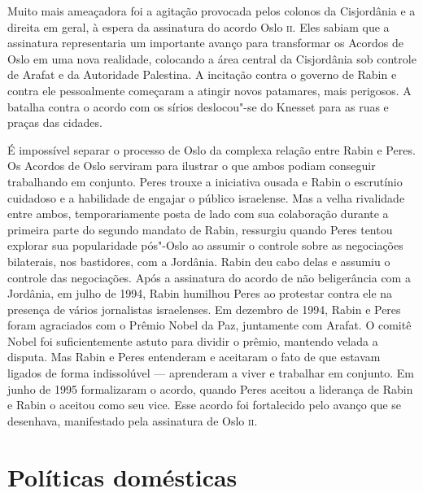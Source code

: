 Muito mais ameaçadora foi a agitação provocada pelos colonos da
Cisjordânia e a direita em geral, à espera da assinatura do acordo Oslo
\textsc{ii}. Eles sabiam que a assinatura representaria um importante avanço para
transformar os Acordos de Oslo em uma nova realidade, colocando a área
central da Cisjordânia sob controle de Arafat e da Autoridade Palestina.
A incitação contra o governo de Rabin e contra ele pessoalmente
começaram a atingir novos patamares, mais perigosos. A batalha contra o
acordo com os sírios deslocou"-se do Knesset para as ruas e praças das
cidades.

É impossível separar o processo de Oslo da complexa relação entre Rabin
e Peres. Os Acordos de Oslo serviram para ilustrar o que ambos podiam
conseguir trabalhando em conjunto. Peres trouxe a iniciativa ousada e
Rabin o escrutínio cuidadoso e a habilidade de engajar o público
israelense. Mas a velha rivalidade entre ambos, temporariamente
posta de lado com sua colaboração durante a primeira parte do segundo
mandato de Rabin, ressurgiu quando Peres tentou explorar sua
popularidade pós"-Oslo ao assumir o controle sobre as negociações
bilaterais, nos bastidores, com a Jordânia. Rabin deu cabo delas e
assumiu o controle das negociações. Após a assinatura do acordo de
não beligerância com a Jordânia, em julho de 1994, Rabin humilhou Peres
ao protestar contra ele na presença de vários jornalistas israelenses.
Em dezembro de 1994, Rabin e Peres foram agraciados com o Prêmio Nobel da
Paz, juntamente com Arafat. O comitê Nobel foi suficientemente astuto
para dividir o prêmio, mantendo velada a disputa. Mas Rabin e Peres
entenderam e aceitaram o fato de que estavam ligados de forma
indissolúvel --- aprenderam a viver e trabalhar em conjunto. Em junho de
1995 formalizaram o acordo, quando Peres aceitou a liderança de Rabin e
Rabin o aceitou como seu vice. Esse acordo foi fortalecido pelo avanço
que se desenhava, manifestado pela assinatura de Oslo \textsc{ii}.

\section{Políticas domésticas}

